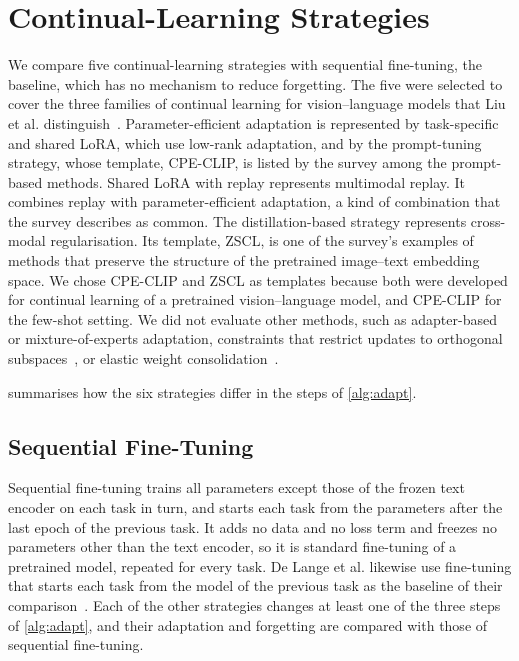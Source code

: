 \section{Continual-Learning Strategies}
\label{sec:method-strategies}

We compare five continual-learning strategies with sequential fine-tuning, the baseline, which has no mechanism to reduce forgetting.
The five were selected to cover the three families of continual learning for vision--language models that Liu et al. distinguish~\cite[Sec.~4]{liu2026continuallearningvlmssurvey}.
Parameter-efficient adaptation is represented by task-specific and shared LoRA, which use low-rank adaptation, and by the prompt-tuning strategy, whose template, CPE-CLIP, is listed by the survey among the prompt-based methods.
Shared LoRA with replay represents multimodal replay.
It combines replay with parameter-efficient adaptation, a kind of combination that the survey describes as common.
The distillation-based strategy represents cross-modal regularisation.
Its template, ZSCL, is one of the survey's examples of methods that preserve the structure of the pretrained image--text embedding space.
We chose CPE-CLIP and ZSCL as templates because both were developed for continual learning of a pretrained vision--language model, and CPE-CLIP for the few-shot setting.
We did not evaluate other methods, such as adapter-based or mixture-of-experts adaptation, constraints that restrict updates to orthogonal subspaces~\cite[Sec.~4]{liu2026continuallearningvlmssurvey}, or elastic weight consolidation~\cite{Kirkpatrick_2017}.

 summarises how the six strategies differ in the steps of \cref{alg:adapt}.

\subsection{Sequential Fine-Tuning}
\label{subsec:method-seqft}

Sequential fine-tuning trains all parameters except those of the frozen text encoder on each task in turn, and starts each task from the parameters after the last epoch of the previous task.
It adds no data and no loss term and freezes no parameters other than the text encoder, so it is standard fine-tuning of a pretrained model, repeated for every task.
De Lange et al. likewise use fine-tuning that starts each task from the model of the previous task as the baseline of their comparison~\cite[Sec.~5]{delange2022}.
Each of the other strategies changes at least one of the three steps of \cref{alg:adapt}, and their adaptation and forgetting are compared with those of sequential fine-tuning.


